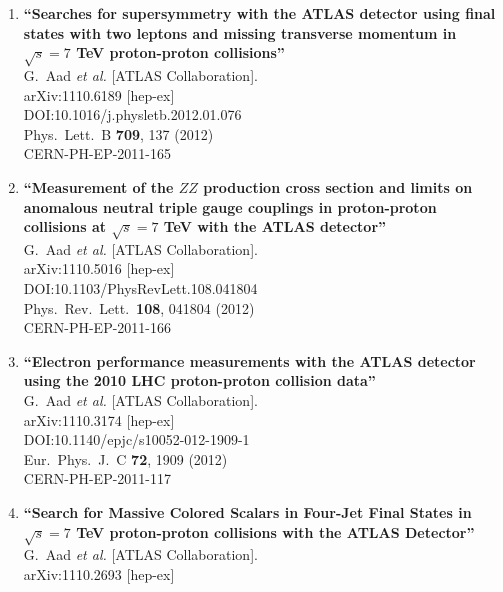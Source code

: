 \documentclass{article}
\begin{document}
\begin{enumerate}
\item%
{\bf ``Searches for supersymmetry with the ATLAS detector using final states with two leptons and missing transverse momentum in $\sqrt{s}=7$ TeV proton-proton collisions''}
  \\{}G.~Aad {\it et al.} [ATLAS Collaboration].
  \\{}arXiv:1110.6189 [hep-ex]
  \\{}DOI:10.1016/j.physletb.2012.01.076
  \\{}Phys.\ Lett.\ B {\bf 709}, 137 (2012)
  \\{}CERN-PH-EP-2011-165
\item%
{\bf ``Measurement of the $Z Z$ production cross section and limits on anomalous neutral triple gauge couplings in proton-proton collisions at $\sqrt{s}=7$ TeV with the ATLAS detector''}
  \\{}G.~Aad {\it et al.} [ATLAS Collaboration].
  \\{}arXiv:1110.5016 [hep-ex]
  \\{}DOI:10.1103/PhysRevLett.108.041804
  \\{}Phys.\ Rev.\ Lett.\  {\bf 108}, 041804 (2012)
  \\{}CERN-PH-EP-2011-166
\item%
{\bf ``Electron performance measurements with the ATLAS detector using the 2010 LHC proton-proton collision data''}
  \\{}G.~Aad {\it et al.} [ATLAS Collaboration].
  \\{}arXiv:1110.3174 [hep-ex]
  \\{}DOI:10.1140/epjc/s10052-012-1909-1
  \\{}Eur.\ Phys.\ J.\ C {\bf 72}, 1909 (2012)
  \\{}CERN-PH-EP-2011-117
\item%
{\bf ``Search for Massive Colored Scalars in Four-Jet Final States in $\sqrt{s}=7$ TeV proton-proton collisions with the ATLAS Detector''}
  \\{}G.~Aad {\it et al.} [ATLAS Collaboration].
  \\{}arXiv:1110.2693 [hep-ex]

\end{enumerate}
\end{document}
